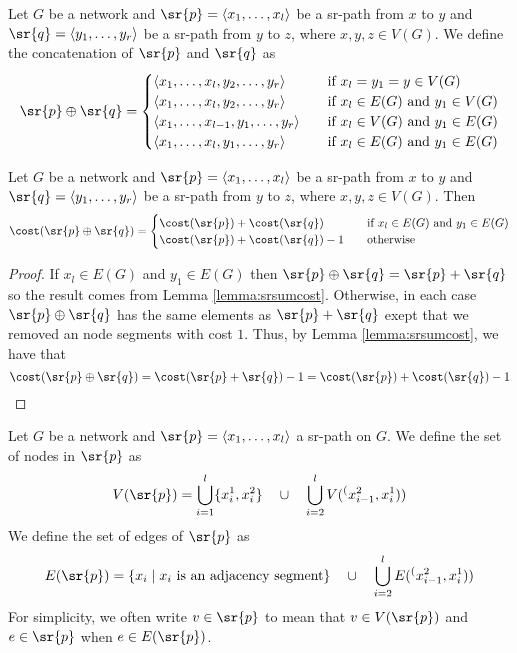 \begin{definition}
Let $G$ be a network and $\sr{p} = \langle x_1, \ldots, x_l \rangle$ be a sr-path from
$x$ to $y$ and $\sr{q} = \langle y_1, \ldots, y_r \rangle$ be a sr-path from $y$ to $z$, where $x, y, z \in V(G)$.
We  define the concatenation of $\sr{p}$ and $\sr{q}$ as
\[ \sr{p} \oplus \sr{q} =
  \begin{cases}
    \langle x_1, \ldots, x_l, y_2, \ldots, y_r \rangle & \quad \text{if } x_l = y_1 = y \in V(G) \\
    \langle x_1, \ldots, x_l, y_2, \ldots, y_r \rangle & \quad \text{if } x_l \in E(G) \text{ and } y_1 \in V(G) \\
    \langle x_1, \ldots, x_{l - 1}, y_1, \ldots, y_r \rangle & \quad \text{if } x_l \in V(G) \text{ and } y_1 \in E(G) \\
    \langle x_1, \ldots, x_l, y_1, \ldots, y_r \rangle & \quad \text{if } x_l \in E(G) \text{ and } y_1 \in E(G) \\
  \end{cases}
\]
\end{definition}

\begin{lemma}
\label{lemma:concat-cost}
Let $G$ be a network and $\sr{p} = \langle x_1, \ldots, x_l \rangle$ be a sr-path from
$x$ to $y$ and $\sr{q} = \langle y_1, \ldots, y_r \rangle$ be a sr-path from $y$ to $z$, where $x, y, z \in V(G)$.
Then
\[ \cost(\sr{p} \oplus \sr{q}) =
  \begin{cases}
    \cost(\sr{p}) + \cost(\sr{q}) & \quad \text{if } x_l \in E(G) \text{ and } y_1 \in E(G) \\
    \cost(\sr{p}) + \cost(\sr{q}) - 1 & \quad \text{otherwise} \\
  \end{cases}
\]
\end{lemma}

\begin{proof}
If $x_l \in E(G)$ and $y_1 \in E(G)$ then $\sr{p} \oplus \sr{q} = \sr{p} + \sr{q}$ so the result comes from 
Lemma \ref{lemma:srsumcost}. Otherwise, in each case $\sr{p} \oplus \sr{q}$ has the same elements as $\sr{p} + \sr{q}$ exept
that we removed an node segments with cost $1$. Thus, by Lemma \ref{lemma:srsumcost}, we have that
$$
\cost(\sr{p} \oplus \sr{q}) = \cost(\sr{p} + \sr{q}) - 1 = \cost(\sr{p}) + \cost(\sr{q}) - 1
$$
\end{proof}

\begin{definition}
Let $G$ be a network and $\sr{p} = \langle x_1, \ldots, x_l \rangle$ a sr-path on $G$. We define the set of nodes in $\sr{p}$ as
$$
V(\sr{p}) = \bigcup_{i = 1}^l \{x^1_i, x^2_i \} \quad \cup \quad \bigcup_{i = 2}^l V(\sp(x^2_{i - 1}, x^1_i))
$$
We define the set of edges of $\sr{p}$ as
$$
E(\sr{p}) = \left\{ x_i \mid \textrm{$x_i$ is an adjacency segment} \right\} \quad \cup \quad \bigcup_{i = 2}^l E(\sp(x^2_{i - 1}, x^1_i))
$$
For simplicity, we often write $v \in \sr{p}$ to mean that $v \in V(\sr{p})$ and $e \in \sr{p}$ when $e \in E(\sr{p})$.
\end{definition}

